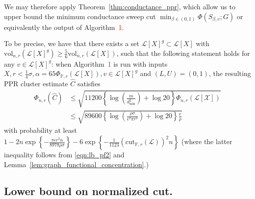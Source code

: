 \documentclass[11pt,twoside]{article}
\newcommand{\set}[1]{\left\{#1\right\}}
\newcommand{\vol}{\mathrm{vol}}
\newcommand{\cut}{\mathrm{cut}}
\newcommand{\1}{\mathbf{1}}
\newcommand{\Xbf}{X}             %
\newcommand{\Pbb}{\mathbb{P}}
\begin{document}
We may therefore apply Theorem~\ref{thm:conductance_ppr}, which allow us to upper bound the minimum conductance sweep cut $\min_{\beta \in (0,1)}\Phi(S_{\beta,v};G)$ or equivalently the output of Algorithm~\textcolor{red}{1}.

To be precise, we have that there exists a set $\mathcal{L}[\Xbf]^g \subset \mathcal{L}[\Xbf]$ with $\vol_{n,r}(\mathcal{L}[\Xbf]^g) \geq \frac{5}{6} \vol_{n,r}(\mathcal{L}[\Xbf])$, such that the following statement holds for any $v \in \mathcal{L}[\Xbf]^g$: when Algorithm~\textcolor{red}{1} is run with inputs $\Xbf, r < \frac{1}{4}\sigma,\alpha = 65 \Phi_{\Pbb,r}(\mathcal{L}[\Xbf]),v \in \mathcal{L}[\Xbf]^g$ and $(L,U) = (0,1)$, the resulting PPR cluster estimate $\widehat{C}$ satisfies
\begin{align}
\Phi_{n,r}(\widehat{C}) & \leq \sqrt{11200\left\{\log\left(\frac{m}{d_{\min}^2}\right) + \log 20\right\} \Phi_{n,r}(\mathcal{L[X]})} \nonumber \\
& \leq \sqrt{89600\left\{\log\left(\frac{\rho \sigma}{\epsilon^2 \pi r^2}\right) + \log 20\right\} \frac{r}{\rho}} \label{eqn:lb_pf4} 
\end{align}
with probability at least $1 - 2n\exp\set{-\frac{\pi\epsilon r^2 n}{8978 \rho \sigma}} - 6 \exp\set{-\frac{1}{1123}(\cut_{\Pbb,r}(\mathcal{L}))^2n}$ (where the latter inequality follows from \eqref{eqn:lb_pf2} and Lemma~\ref{lem:graph_functional_concentration}.)

\subsection{Lower bound on normalized cut.}
\end{document}
